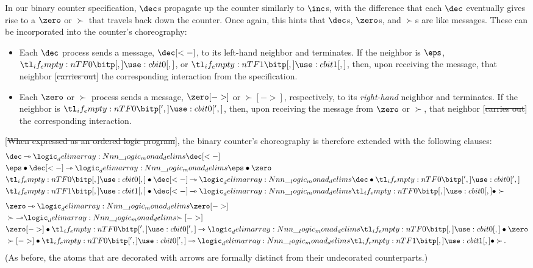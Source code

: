 In our binary counter specification, $\dec$s propagate up the counter similarly to $\inc$s, with the difference that each $\dec$ eventually gives rise to a $\zero$ or $\succ$ that travels back down the counter.
Once again, this hints that $\dec$s, $\zero$s, and $\succ$s are like messages.
These can be incorporated into the counter's choreography:
\begin{itemize}
\item Each $\dec$ process sends a message, $\dec[<-]$, to its left-hand neighbor and terminates.
      If the neighbor is $\eps$, $\bit{0}$, or $\bit{1}$, then, upon receiving the message, that neighbor [\st{carries out}] the corresponding interaction from the specification.
\item Each $\zero$ or $\succ$ process sends a message, $\zero[->]$ or $\succ[->]$, respectively, to its \emph{right-hand} neighbor and terminates.
      If the neighbor is $\bit[']{0}$, then, upon receiving the message from $\zero$ or $\succ$, that neighbor [\st{carries out}] the corresponding interaction.
\end{itemize}
[\st{When expressed as an ordered logic program}], the binary counter's choreography is therefore extended with the following clauses:
\begin{align*}
  &\dec \lrimp \monad{\dec[<-]} \\
  &\eps \fuse \dec[<-] \lrimp \monad{\eps \fuse \zero} \\
  &\bit{0} \fuse \dec[<-] \lrimp \monad{\dec \fuse \bit[']{0}} \\
  &\bit{1} \fuse \dec[<-] \lrimp \monad{\bit{0} \fuse \succ} \\[1.5\jot]
  &\zero \lrimp \monad{\zero[->]} \\
  &\succ \lrimp \monad{\succ[->]} \\
  &\zero[->] \fuse \bit[']{0} \lrimp \monad{\bit{0} \fuse \zero} \\
  &\succ[->] \fuse \bit[']{0} \lrimp \monad{\bit{1} \fuse \succ}
  \,.
\end{align*}
(As before, the atoms that are decorated with arrows are formally distinct from their undecorated counterparts.)

